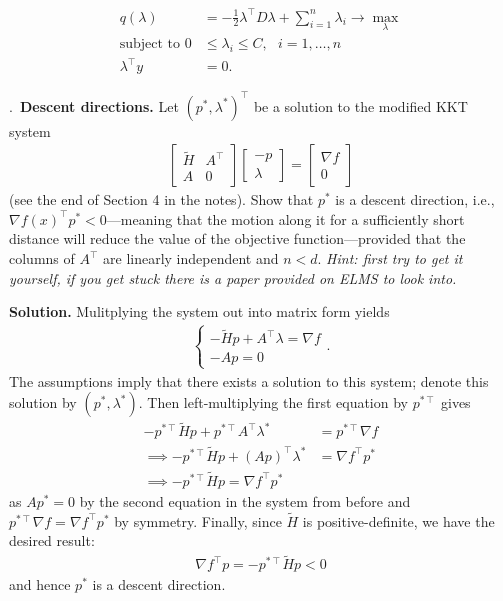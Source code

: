 \documentclass{letter}
\newcounter{problem}
\newcounter{solution}
\newcommand{\Problem}[2]{%
	\stepcounter{problem}%
	\leftskip=0pt%
	\theproblem.~\textbf{{#1.}} #2 \par%
}
\newcommand{\Solution}[1]{%
	\textbf{Solution.} #1 \par%
}
\newcommand{\T}{\intercal}
\begin{document}
{\begin{align*}
        q(\lambda) &= -\frac{1}{2}\lambda^\T D \lambda + \sum_{i=1}^n \lambda_i \rightarrow \max_\lambda \\
        \text{subject to } 0 &\leq \lambda_i \leq C, \text{ } i = 1, \dots, n \\
        \lambda^\T y &= 0. 
    \end{align*}}

    \Problem{Descent directions}{Let $(p^*, \lambda^*)^\T$ be a solution to the modified KKT system \begin{align*}
        \begin{bmatrix} \tilde{H} & A^\T \\ A & 0 \end{bmatrix} \begin{bmatrix} -p \\ \lambda \end{bmatrix} = \begin{bmatrix} \nabla f \\ 0 \end{bmatrix} 
    \end{align*} (see the end of Section 4 in the notes). Show that $p^*$ is a descent direction, i.e., $\nabla f(x)^\T p^* < 0$---meaning that the motion along it for a sufficiently short distance will reduce the value of the objective function---provided that the columns of $A^\T$ are linearly independent and $n < d$. \emph{Hint: first try to get it yourself, if you get stuck there is a paper provided on ELMS to look into.}}
    \Solution{Mulitplying the system out into matrix form yields \begin{align*}
        \begin{cases} -\tilde{H}p + A^\T\lambda = \nabla f \\ -Ap = 0 \end{cases}.
    \end{align*} The assumptions imply that there exists a solution to this system; denote this solution by $(p^*, \lambda^*)$. Then left-multiplying the first equation by $p^{*\T}$ gives \begin{align*}
        -p^{*\T} \tilde{H} p + p^{*\T}A^\T\lambda^* &= p^{*\T}\nabla f \\
        \implies -p^{*\T} \tilde{H} p + (Ap)^\T\lambda^* &= \nabla f^\T p^* \\
        \implies -p^{*\T} \tilde{H} p = \nabla f^\T p^* 
    \end{align*} as $Ap^* = 0$ by the second equation in the system from before and $p^{*\T}\nabla f = \nabla f^\T p^*$ by symmetry. Finally, since $\tilde{H}$ is positive-definite, we have the desired result: \begin{align*}
        \nabla f^\T p = -p^{*\T}\tilde{H}p < 0
    \end{align*} and hence $p^*$ is a descent direction.}
\end{document}
